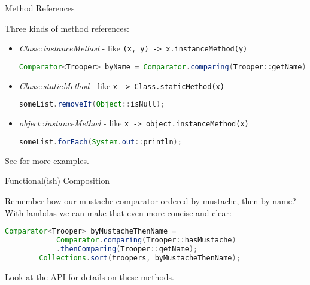 \documentclass{beamer}
\begin{document}
\begin{frame}[fragile]{Method References}

Three kinds of method references:
\begin{itemize}

\item {\it Class}::{\it instanceMethod} - like {\tt (x, y) -> x.instanceMethod(y)}
\begin{lstlisting}[language=Java]
Comparator<Trooper> byName = Comparator.comparing(Trooper::getName);
\end{lstlisting}

\item {\it Class}::{\it staticMethod} - like {\tt x -> Class.staticMethod(x)}
\begin{lstlisting}[language=Java]
someList.removeIf(Object::isNull);
\end{lstlisting}


\item {\it object}::{\it instanceMethod} - like {\tt x -> object.instanceMethod(x)}
\begin{lstlisting}[language=Java]
someList.forEach(System.out::println);
\end{lstlisting}

\end{itemize}

See  for more examples.

\end{frame}

\begin{frame}[fragile]{Functional(ish) Composition}

Remember how our mustache comparator ordered by mustache, then by name?\\

With lambdas we can make that even more concise and clear:

\begin{lstlisting}[language=Java]
        Comparator<Trooper> byMustacheThenName =
            Comparator.comparing(Trooper::hasMustache)
            .thenComparing(Trooper::getName);
        Collections.sort(troopers, byMustacheThenName);
\end{lstlisting}

Look at the  API for details on these methods.

\end{frame}







\end{document}
